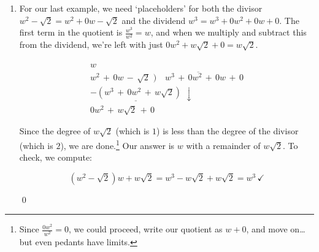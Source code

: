 \documentclass{ximera}
\begin{document}
\begin{example}
\begin{explanation}
\begin{enumerate}
\[
\begin{array}{r}
3y\,-\,\frac{15}{2}\\
2y\,+\,5 \, \overline{)\quad \,6y^2\,+\,0y\,-\,1} \\
 \underline{-\left(\,6y^2\,+\,15y\right)} \phantom{1}\downarrow\\
 -15y-\,1\\
  \underline{-\left(-15y-\,\frac{75}{2}\right)}\\
  \frac{73}{2}
\end{array}
\]

\item For our last example, we need `placeholders' for both the divisor  $w^2 - \sqrt{2} = w^2 + 0w -\sqrt{2}$ and the dividend $w^3 = w^3 + 0w^2 + 0w + 0$.  The first term in the quotient is $\frac{w^3}{w^2} = w$, and when we multiply and subtract this from the dividend, we're left with just $0w^2 + w\sqrt{2} + 0 = w\sqrt{2}$.

\[
\begin{array}{r}
w\,\phantom{\,-2\,14}\\
w^2\,+\,0w\,-\,\sqrt{2} \,\, \overline{)\quad w^3\,+\,0w^2\,+\,0w\,+\,0} \\
 \underline{-\left(w^3\,+\,0w^2\,+\,w\sqrt{2}\right)}\,\,\downarrow \\
 0w^2\,+\,w\sqrt{2}\,+\,0
\end{array}
\]

Since the degree of $w\sqrt{2}$ (which is $1$) is less than the degree of the divisor (which is $2$), we are done.\footnote{Since $\frac{0w^2}{w^2} = 0$, we could proceed, write our quotient as $w+0$, and move on\ldots but even pedants have limits.}  Our answer is $w$ with a remainder of $w \sqrt{2}$.  To check, we compute:

\[ \left(w^2 - \sqrt{2}\right)w + w\sqrt{2} = w^3 - w\sqrt{2} + w\sqrt{2} = w^3 \, \checkmark\]

\vspace{-0.3in}\qed

\end{enumerate}
\end{explanation}
\end{example}




\end{document}
